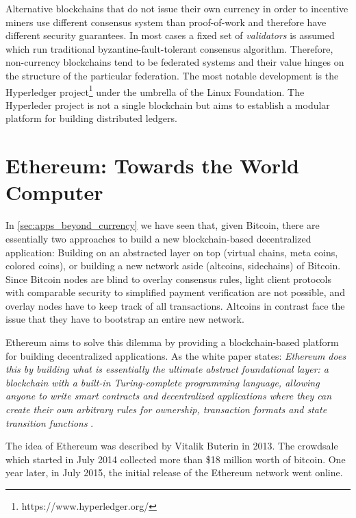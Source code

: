 Alternative blockchains that do not issue their own currency in order to incentive miners use different consensus system than proof-of-work and therefore have different security guarantees. In most cases a fixed set of \emph{validators} is assumed which run traditional byzantine-fault-tolerant consensus algorithm. Therefore, non-currency blockchains tend to be federated systems and their value hinges on the structure of the particular federation. The most notable development is the Hyperledger project\footnote{https://www.hyperledger.org/} under the umbrella of the Linux Foundation. The Hyperleder project is not a single blockchain but aims to establish a modular platform for building distributed ledgers.



\section{Ethereum: Towards the World Computer}
\label{sec:ethereum}

In \ref{sec:apps_beyond_currency} we have seen that, given Bitcoin, there are essentially two approaches to build a new blockchain-based decentralized application: Building on an abstracted layer on top (virtual chains, meta coins, colored coins), or building a new network aside (altcoins, sidechains) of Bitcoin. Since Bitcoin nodes are blind to overlay consensus rules, light client protocols with comparable security to simplified payment verification are not possible, and overlay nodes have to keep track of all transactions. Altcoins in contrast face the issue that they have to bootstrap an entire new network.

Ethereum aims to solve this dilemma by providing a blockchain-based platform for building decentralized applications. As the white paper states: \emph{Ethereum does this by building what is essentially the ultimate abstract foundational layer: a blockchain with a built-in Turing-complete programming language, allowing anyone to write smart contracts and decentralized applications where they can create their own arbitrary rules for ownership, transaction formats and state transition functions} \parencite{ethereumWhite}.

The idea of Ethereum was described by Vitalik Buterin in 2013. The crowdsale which started in July 2014 collected more than \$18 million worth of bitcoin. One year later, in July 2015, the initial release of the Ethereum network went online. 


